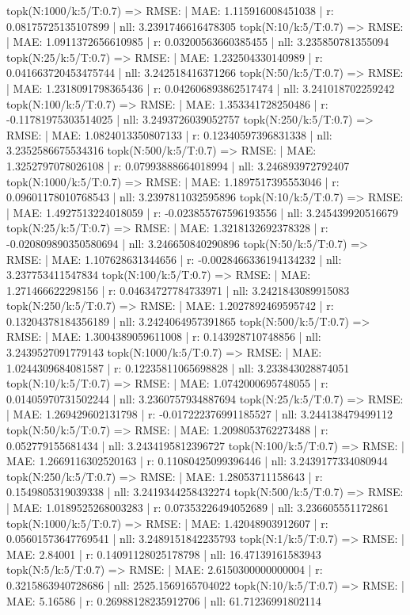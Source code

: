 topk(N:1000/k:5/T:0.7) => RMSE: | MAE: 1.115916008451038 | r: 0.08175725135107899 | nll: 3.2391746616478305
topk(N:10/k:5/T:0.7) => RMSE: | MAE: 1.0911372656610985 | r: 0.03200563660385455 | nll: 3.235850781355094
topk(N:25/k:5/T:0.7) => RMSE: | MAE: 1.232504330140989 | r: 0.041663720453475744 | nll: 3.242518416371266
topk(N:50/k:5/T:0.7) => RMSE: | MAE: 1.2318091798365436 | r: 0.042606893862517474 | nll: 3.241018702259242
topk(N:100/k:5/T:0.7) => RMSE: | MAE: 1.353341728250486 | r: -0.11781975303514025 | nll: 3.2493726039052757
topk(N:250/k:5/T:0.7) => RMSE: | MAE: 1.0824013350807133 | r: 0.12340597396831338 | nll: 3.2352586675534316
topk(N:500/k:5/T:0.7) => RMSE: | MAE: 1.3252797078026108 | r: 0.07993888664018994 | nll: 3.246893972792407
topk(N:1000/k:5/T:0.7) => RMSE: | MAE: 1.1897517395553046 | r: 0.09601178010768543 | nll: 3.2397811032595896
topk(N:10/k:5/T:0.7) => RMSE: | MAE: 1.4927513224018059 | r: -0.023855767596193556 | nll: 3.245439920516679
topk(N:25/k:5/T:0.7) => RMSE: | MAE: 1.3218132692378328 | r: -0.020809890350580694 | nll: 3.246650840290896
topk(N:50/k:5/T:0.7) => RMSE: | MAE: 1.107628631344656 | r: -0.0028466336194134232 | nll: 3.237753411547834
topk(N:100/k:5/T:0.7) => RMSE: | MAE: 1.271466622298156 | r: 0.04634727784733971 | nll: 3.2421843089915083
topk(N:250/k:5/T:0.7) => RMSE: | MAE: 1.2027892469595742 | r: 0.13204378184356189 | nll: 3.2424064957391865
topk(N:500/k:5/T:0.7) => RMSE: | MAE: 1.3004389059611008 | r: 0.143928710748856 | nll: 3.2439527091779143
topk(N:1000/k:5/T:0.7) => RMSE: | MAE: 1.0244309684081587 | r: 0.12235811065698828 | nll: 3.233843028874051
topk(N:10/k:5/T:0.7) => RMSE: | MAE: 1.0742000695748055 | r: 0.01405970731502244 | nll: 3.2360757934887694
topk(N:25/k:5/T:0.7) => RMSE: | MAE: 1.269429602131798 | r: -0.017222376991185527 | nll: 3.244138479499112
topk(N:50/k:5/T:0.7) => RMSE: | MAE: 1.2098053762273488 | r: 0.052779155681434 | nll: 3.2434195812396727
topk(N:100/k:5/T:0.7) => RMSE: | MAE: 1.2669116302520163 | r: 0.11080425099396446 | nll: 3.2439177334080944
topk(N:250/k:5/T:0.7) => RMSE: | MAE: 1.28053711158643 | r: 0.1549805319039338 | nll: 3.2419344258432274
topk(N:500/k:5/T:0.7) => RMSE: | MAE: 1.0189525268003283 | r: 0.07353226494052689 | nll: 3.236605551172861
topk(N:1000/k:5/T:0.7) => RMSE: | MAE: 1.42048903912607 | r: 0.05601573647769541 | nll: 3.2489151842235793
topk(N:1/k:5/T:0.7) => RMSE: | MAE: 2.84001 | r: 0.14091128025178798 | nll: 16.47139161583943
topk(N:5/k:5/T:0.7) => RMSE: | MAE: 2.6150300000000004 | r: 0.3215863940728686 | nll: 2525.1569165704022
topk(N:10/k:5/T:0.7) => RMSE: | MAE: 5.16586 | r: 0.26988128235912706 | nll: 61.71236991802114
